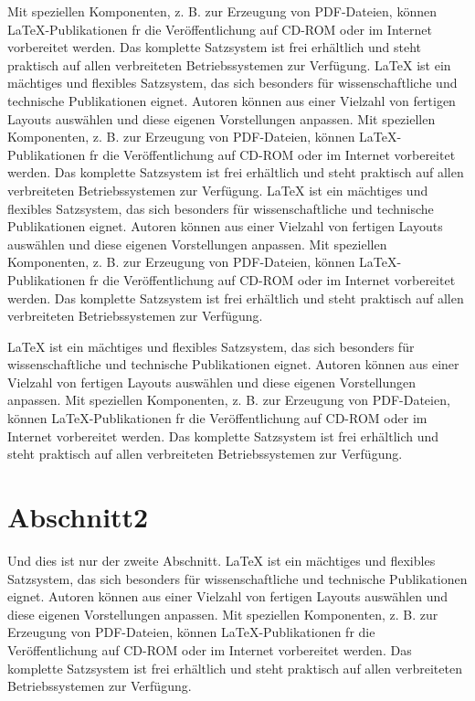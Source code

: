 \documentclass[a4paper,onecolumn,draft,pdftex]{report}
\begin{document}
Mit speziellen Komponenten, z. B. zur Erzeugung 
von PDF-Dateien, k\"onnen LaTeX-Publikationen fr die Ver\"offentlichung 
auf CD-ROM oder im Internet vorbereitet werden. Das komplette Satzsystem 
ist frei erh\"altlich und steht praktisch auf allen verbreiteten Betriebssystemen 
zur Verf\"ugung.
LaTeX ist ein m\"achtiges und flexibles Satzsystem, das sich besonders f\"ur
wissenschaftliche und technische Publikationen eignet. Autoren k\"onnen
aus einer Vielzahl von fertigen Layouts ausw\"ahlen und diese eigenen 
Vorstellungen anpassen. Mit speziellen Komponenten, z. B. zur Erzeugung 
von PDF-Dateien, k\"onnen LaTeX-Publikationen fr die Ver\"offentlichung 
auf CD-ROM oder im Internet vorbereitet werden. Das komplette Satzsystem 
ist frei erh\"altlich und steht praktisch auf allen verbreiteten Betriebssystemen 
zur Verf\"ugung.
LaTeX ist ein m\"achtiges und flexibles Satzsystem, das sich besonders f\"ur
wissenschaftliche und technische Publikationen eignet. Autoren k\"onnen
aus einer Vielzahl von fertigen Layouts ausw\"ahlen und diese eigenen 
Vorstellungen anpassen. Mit speziellen Komponenten, z. B. zur Erzeugung 
von PDF-Dateien, k\"onnen LaTeX-Publikationen fr die Ver\"offentlichung 
auf CD-ROM oder im Internet vorbereitet werden. Das komplette Satzsystem 
ist frei erh\"altlich und steht praktisch auf allen verbreiteten Betriebssystemen 
zur Verf\"ugung.

LaTeX ist ein m\"achtiges und flexibles Satzsystem, das sich besonders f\"ur
wissenschaftliche und technische Publikationen eignet. Autoren k\"onnen
aus einer Vielzahl von fertigen Layouts ausw\"ahlen und diese eigenen 
Vorstellungen anpassen. Mit speziellen Komponenten, z. B. zur Erzeugung 
von PDF-Dateien, k\"onnen LaTeX-Publikationen fr die Ver\"offentlichung 
auf CD-ROM oder im Internet vorbereitet werden. Das komplette Satzsystem 
ist frei erh\"altlich und steht praktisch auf allen verbreiteten Betriebssystemen 
zur Verf\"ugung. 

\section{Abschnitt2}
Und dies ist nur der zweite Abschnitt. LaTeX ist ein m\"achtiges und flexibles Satzsystem, das sich besonders f\"ur
wissenschaftliche und technische Publikationen eignet. Autoren k\"onnen
aus einer Vielzahl von fertigen Layouts ausw\"ahlen und diese eigenen 
Vorstellungen anpassen. Mit speziellen Komponenten, z. B. zur Erzeugung 
von PDF-Dateien, k\"onnen LaTeX-Publikationen fr die Ver\"offentlichung 
auf CD-ROM oder im Internet vorbereitet werden. Das komplette Satzsystem 
ist frei erh\"altlich und steht praktisch auf allen verbreiteten Betriebssystemen 
zur Verf\"ugung.
\end{document}
